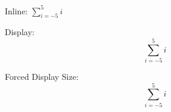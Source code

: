 \documentclass[preview, border=1pt, varwidth]{standalone}
\begin{document}
Inline: $\sum_{i=-5}^{5} i$  

Display:
\[
\sum_{i=-5}^{5} i
\]

Forced Display Size:
\[
\displaystyle\sum_{i=-5}^{5} i
\]
\end{document}
